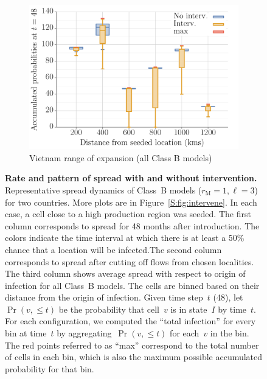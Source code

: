 \documentclass[11pt]{article}
\newcommand{\mooreRange}{r_\mathrm{M}}
\theoremstyle{definition}
\begin{document}
\begin{figure}[ht]
\begin{subfigure}[b]{.43\textwidth}
\includegraphics[width=\textwidth]{../cellular_automata/results/dist_inf_plots/VN_dist_prob_B_box.pdf}
\caption{Vietnam range of expansion (all Class B models)\label{fig:vnmBContourBox}}
\end{subfigure}
\caption{\textbf{Rate and pattern of spread with and without intervention.}
Representative spread dynamics of Class~B models ($\mooreRange=1, \ell=3$)
for two countries. More plots are in Figure~\ref{S:fig:intervene}. In each
case, a cell close to a high production region was seeded. The first column
corresponds to spread for 48 months after introduction. The colors indicate
the time interval at which there is at least a 50\% chance that a location
will be infected.The second column corresponds to spread after cutting off
flows from chosen localities. The third column shows average spread with
respect to origin of infection for all Class~B models. The cells are binned
based on their distance from the origin of infection. Given time step~$t$
(48), let $\Pr(v,\le t)$ be the probability that cell~$v$ is in state~$I$
by time~$t$. For each configuration, we computed the ``total
infection'' for every bin at time~$t$ by aggregating~$\Pr(v,\le t)$ for
each~$v$ in the bin. The red points referred to as ``max'' correspond to
the total number of cells in each bin, which is also the maximum possible
accumulated probability for that bin.
\label{fig:spread}}
\end{figure}
\end{document}
